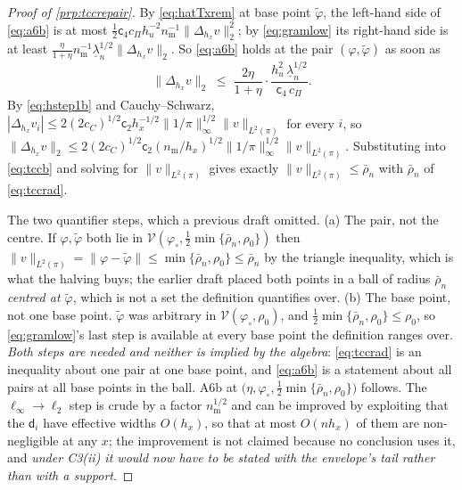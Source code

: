 \begin{proof}[Proof of \cref{prp:tccrepair}]
By \eqref{eq:hatTxrem} at base point $\tilde\varphi$, the left-hand side of \eqref{eq:a6b} is at most
$\tfrac12\mathsf c_4c_\Pi h_u^{-2}n_{\mathrm m}^{-1}\|\Delta_{h_x}v\|_2^{2}$; by \eqref{eq:gramlow} its
right-hand side is at least
$\tfrac{\eta}{1+\eta}n_{\mathrm m}^{-1}\underline\lambda_n^{1/2}\|\Delta_{h_x}v\|_2$. So
\eqref{eq:a6b} holds at the pair $(\varphi,\tilde\varphi)$ as soon as
\begin{equation}\label{eq:tccb}
\big\|\Delta_{h_x}v\big\|_{2}\;\le\;\frac{2\eta}{1+\eta}\cdot\frac{h_u^{2}\,\underline\lambda_n^{1/2}}{\mathsf c_4\,c_\Pi} .
\end{equation}
By \eqref{eq:hstep1b} and Cauchy--Schwarz, $|\Delta_{h_x}v_i|\le2(2c_C)^{1/2}\mathsf c_2h_x^{-1/2}\|1/\pi\|_\infty^{1/2}\|v\|_{L^{2}(\pi)}$
for every $i$, so $\|\Delta_{h_x}v\|_2\le 2(2c_C)^{1/2}\mathsf c_2 (n_{\mathrm m}/h_x)^{1/2}\|1/\pi\|_\infty^{1/2}\|v\|_{L^{2}(\pi)}$.
Substituting into \eqref{eq:tccb} and solving for $\|v\|_{L^{2}(\pi)}$ gives exactly
$\|v\|_{L^{2}(\pi)}\le\bar\rho_n$ with $\bar\rho_n$ of \eqref{eq:tccrad}.

The two quantifier steps, which a previous draft omitted. (a) The pair, not the centre.
If $\varphi,\tilde\varphi$ both lie in $\mathcal V(\varphi_\circ,\tfrac12\min\{\bar\rho_n,\rho_0\})$
then $\|v\|_{L^{2}(\pi)}=\|\varphi-\tilde\varphi\|\le\min\{\bar\rho_n,\rho_0\}\le\bar\rho_n$ by the
triangle inequality, which is what the halving buys; the earlier draft placed both points in a ball of
radius $\bar\rho_n$ \emph{centred at $\tilde\varphi$}, which is not a set the definition quantifies
over. (b) The base point, not one base point. $\tilde\varphi$ was arbitrary in
$\mathcal V(\varphi_\circ,\rho_0)$, and $\tfrac12\min\{\bar\rho_n,\rho_0\}\le\rho_0$, so
\eqref{eq:gramlow}'s last step is available at every base point the definition ranges over. \emph{Both
steps are needed and neither is implied by the algebra}: \eqref{eq:tccrad} is an inequality about one
pair at one base point, and \eqref{eq:a6b} is a statement about all pairs at all base points in the
ball. A6b at $\big(\eta,\varphi_\circ,\tfrac12\min\{\bar\rho_n,\rho_0\}\big)$ follows.
The $\ell_\infty\to\ell_2$ step is crude by a factor $n_{\mathrm m}^{1/2}$ and can be improved by
exploiting that the $\mathsf d_i$ have effective widths $O(h_x)$, so that at most
$O(nh_x)$ of them are non-negligible at any $x$; the improvement is not claimed because no conclusion
uses it, and \emph{under C3(ii) it would now have to be stated with the envelope's tail rather than
with a support}.
\end{proof}

